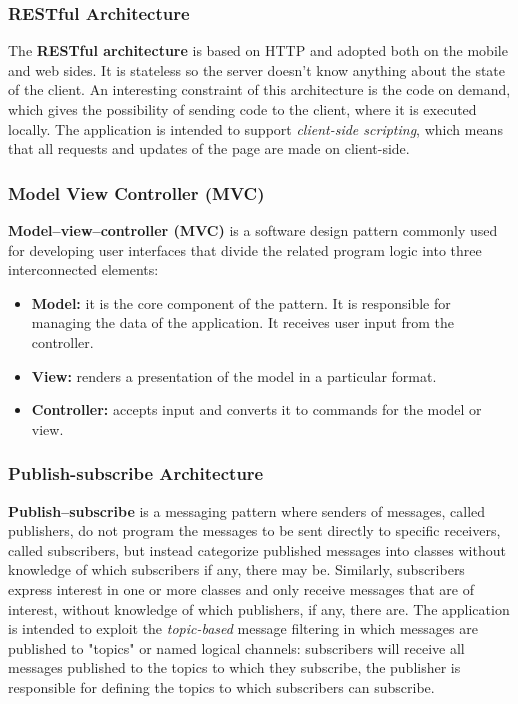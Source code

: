 \subsubsection{RESTful Architecture}
The \textbf{RESTful architecture} is based on HTTP and adopted both on the mobile and web sides. It is stateless so the server doesn't know anything
about the state of the client. \newline
An interesting constraint of this architecture is the code on demand, which gives the possibility of sending code to the client, where it is
executed locally. The application is intended to support \emph{client-side scripting}, which means that all requests and updates of the page are
made on client-side.

\subsubsection{Model View Controller (MVC)}
\textbf{Model–view–controller (MVC)} is a software design pattern commonly used for developing user interfaces that divide the related program logic into three
interconnected elements:
\begin{itemize}
    \item \textbf{Model:} it is the core component of the pattern. It is responsible for managing the data of the application. It receives user input from the controller.
    \item \textbf{View:} renders a presentation of the model in a particular format.
    \item \textbf{Controller:} accepts input and converts it to commands for the model or view.
\end{itemize}

\subsubsection{Publish-subscribe Architecture}
\textbf{Publish–subscribe} is a messaging pattern where senders of messages, called publishers, do not program the messages to be sent directly to specific receivers, called
subscribers, but instead categorize published messages into classes without knowledge of which subscribers if any, there may be. Similarly, subscribers express interest
in one or more classes and only receive messages that are of interest, without knowledge of which publishers, if any, there are. The application is intended to exploit the
\emph{topic-based} message filtering in which messages are published to "topics" or named logical channels: subscribers will receive all messages published to the topics to which
they subscribe, the publisher is responsible for defining the topics to which subscribers can subscribe.


